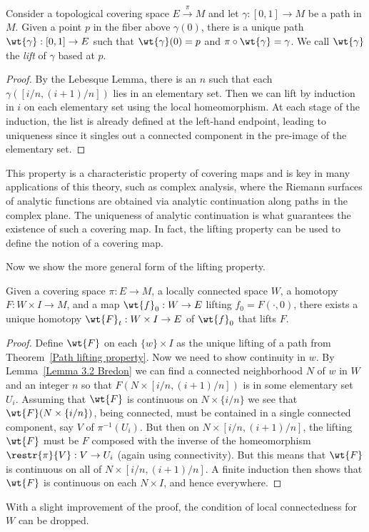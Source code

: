 \begin{thm}\label{Path lifting property}
Consider a topological covering space $E\overset{\pi}{\to}M$ and let $\gamma:[0,1]\to M$ be a path in $M$. Given a point $p$ in the fiber above $\gamma(0)$, there is a unique path $\wt{\gamma}:[0,1]\to E$ such that $\wt{\gamma}(0)=p$ and $\pi\circ\wt{\gamma}=\gamma$. We call $\wt{\gamma}$ the \emph{lift} of $\gamma$ based at $p$.
\end{thm}
\begin{proof}
By the Lebesque Lemma, there is an $n$ such that each $\gamma([i/n,(i+1)/n])$ lies in an elementary set. Then we can lift by induction in $i$ on each elementary set using the local homeomorphism. At each stage of the induction, the list is already defined at the left-hand endpoint, leading to uniqueness since it singles out a connected component in the pre-image of the elementary set.
\end{proof}
This property is a characteristic property of covering maps and is key in many applications of this theory, such as complex analysis, where the Riemann surfaces of analytic functions are obtained via analytic continuation along paths in the complex plane. The uniqueness of analytic continuation is what guarantees the existence of such a covering map. In fact, the lifting property can be used to define the notion of a covering map.

Now we show the more general form of the lifting property.
\begin{thm}\label{homotopy lifting property}
    Given a covering space $\pi :E\to M$, a locally connected space $W$, a homotopy $F :W\times I\to M$, and a map $\wt{f}_0:W\to E$ lifting $f_0=F(\cdot ,0)$, there exists a unique homotopy $\wt{F}_t: W\times I\to E$ of $\wt{f}_0$ that lifts $F$.
\end{thm}
\begin{proof}
    Define $\wt{F}$ on each $\{w\}\times I$ as the unique lifting of a path from Theorem~\ref{Path lifting property}. Now we need to show continuity in $w$. By Lemma~\ref{Lemma 3.2 Bredon} we can find a connected neighborhood $N$ of $w$ in $W$ and an integer $n$ so that $F(N\times [i/n,(i+1)/n])$ is in some elementary set $U_i$. Assuming that $\wt{F}$ is continuous on $N\times \{i/n\}$ we see that $\wt{F}(N\times\{i/n\})$, being connected, must be contained in a  single connected component, say $V$ of $\pi^{-1}(U_i)$. But then on $N\times[i/n,(i+1)/n]$, the lifting $\wt{F}$ must be $F$ composed with the inverse of the homeomorphism $\restr{\pi}{V}:V\to U_i$ (again using connectivity). But this means that $\wt{F}$ is continuous on all of $N\times [i/n,(i+1)/n]$. A finite induction then shows that $\wt{F}$ is continuous on each $N\times I$, and hence everywhere.
\end{proof}
\begin{rem}
    With a slight improvement of the proof, the condition of local connectedness for $W$ can be dropped.
\end{rem}


